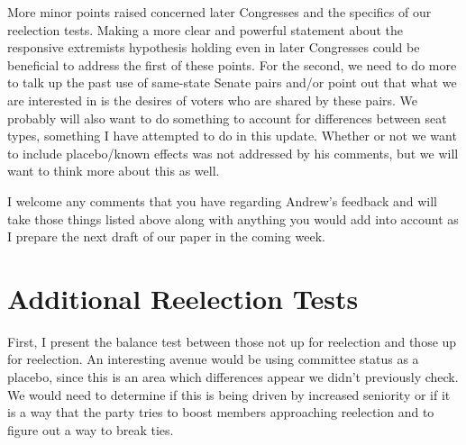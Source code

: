 \documentclass[12pt]{article}
\begin{document}
More minor points raised concerned later Congresses and the specifics of our reelection tests. Making a more clear and powerful statement about the responsive extremists hypothesis holding even in later Congresses could be beneficial to address the first of these points. For the second, we need to do more to talk up the past use of same-state Senate pairs and/or point out that what we are interested in is the desires of voters who are shared by these pairs. We probably will also want to do something to account for differences between seat types, something I have attempted to do in this update. Whether or not we want to include placebo/known effects was not addressed by his comments, but we will want to think more about this as well.

I welcome any comments that you have regarding Andrew's feedback and will take those things listed above along with anything you would add into account as I prepare the next draft of our paper in the coming week.

\section{Additional Reelection Tests}

First, I present the balance test between those not up for reelection and those up for reelection. An interesting avenue would be using committee status as a placebo, since this is an area which differences appear we didn't previously check. We would need to determine if this is being driven by increased seniority or if it is a way that the party tries to boost members approaching reelection and to figure out a way to break ties.
\end{document}

